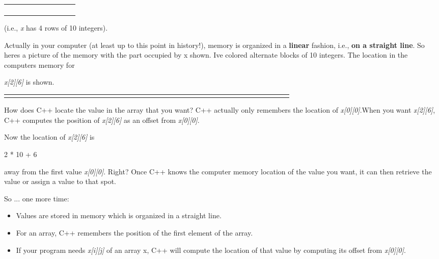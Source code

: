 \begin{longtable}[]{@{}llllllllll@{}}
\toprule\noalign{}
& & & & & & & & & \\
\midrule\noalign{}
\endhead
\bottomrule\noalign{}
\endlastfoot
& & & & & & & & & \\
& & & & & & & & & \\
& & & & & & & & & \\
& & & & & & & & & \\
\end{longtable}

(i.e., \emph{x} has 4 rows of 10 integers).

Actually in your computer (at least up to this point in history!),
memory is organized in a \textbf{linear} fashion, i.e., \textbf{on a
straight line}. So here\textquotesingle s a picture of the memory with
the part occupied by x shown. I\textquotesingle ve colored alternate
blocks of 10 integers. The location in the computer\textquotesingle s
memory for

\emph{x{[}2{]}{[}6{]}} is shown.

\begin{longtable}[]{@{}llllllllllllllllllllllllllllllllllllllll@{}}
\toprule\noalign{}
& & & & & & & & & & & & & & & & & & & & & & & & & & & & & & & & & & & &
& & & \\
\midrule\noalign{}
\endhead
\bottomrule\noalign{}
\endlastfoot
& & & & & & & & & & & & & & & & & & & & & & & & & & & & & & & & & & & &
& & & \\
\end{longtable}

How does C++ locate the value in the array that you want? C++ actually
only remembers the location of \emph{x{[}0{]}{[}0{]}}.When you want
\emph{x{[}2{]}{[}6{]}}, C++ computes the position of
\emph{x{[}2{]}{[}6{]}} as an offset from \emph{x{[}0{]}{[}0{]}}.

Now the location of \emph{x{[}2{]}{[}6{]}} is

2 * 10 + 6

away from the first value \emph{x{[}0{]}{[}0{]}}. Right? Once C++ knows
the computer memory location of the value you want, it can then retrieve
the value or assign a value to that spot.

So ... one more time:

\begin{itemize}
\tightlist
\item
  Values are stored in memory which is organized in a straight line.
\item
  For an array, C++ remembers the position of the first element of the
  array.
\item
  If your program needs \emph{x{[}i{]}{[}j{]}} of an array x, C++ will
  compute the location of that value by computing it\textquotesingle s
  offset from \emph{x{[}0{]}{[}0{]}}.
\end{itemize}


